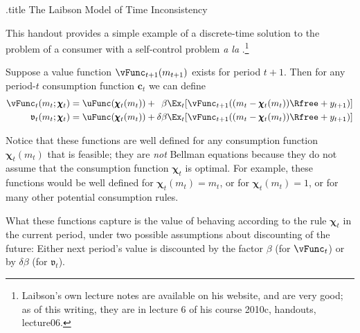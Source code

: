 \documentclass{handout}
\begin{document}
\handoutHeader

\begin{verbatimwrite}{\jobname.title}
The Laibson Model of Time Inconsistency
\end{verbatimwrite}

\handoutNameMake

This handout provides a simple example of a discrete-time 
solution to the problem of a consumer with a self-control
problem {\it a la} \cite{laibson:goldeneggs}.\footnote{Laibson's
own lecture notes are available on his website, and are very
good; as of this writing, they are in lecture 6 of his course 2010c, 
handouts, lecture06.}

\newcommand{\bc}{\mathbf{c}}
\newcommand{\bu}{\uFunc}
\newcommand{\bv}{\vFunc}
\newcommand{\gv}{\mathfrak{v}}
\newcommand{\gc}{\mathfrak{c}}
\newcommand{\bw}{\mathbf{w}}


Suppose a value function $\bv_{t+1}(m_{t+1})$ exists for period $t+1$.  
Then for any period-$t$ consumption function $\bc_{t}$ we can define 
\begin{equation}\begin{gathered}\begin{aligned}
   {\bv}_{t}(m_{t};\pmb{\chi}_{t}) & =  \bu(\pmb{\chi}_{t}(m_{t})) + \phantom{\delta} \beta  \Ex_{t}[{\bv}_{t+1}((m_{t}-\pmb{\chi}_{t}(m_{t}))\Rfree+y_{t+1})] \label{eq:bv}
\\ {\gv}_{t}(m_{t};\pmb{\chi}_{t}) & =  \bu(\pmb{\chi}_{t}(m_{t})) +          \delta  \beta  \Ex_{t}[{\bv}_{t+1}((m_{t}-\pmb{\chi}_{t}(m_{t}))\Rfree+y_{t+1})] %
\end{aligned}\end{gathered}\end{equation}

Notice that these functions are well defined for any consumption function $\pmb{\chi}_{t}(m_{t})$ 
that is feasible; they are {\it not} Bellman equations because they do not assume that
the consumption function $\pmb{\chi}_{t}$ is optimal.  For example, these functions would be
well defined for $\pmb{\chi}_{t}(m_{t}) = m_{t}$, or for $\pmb{\chi}_{t}(m_{t})=1$, or for many other
potential consumption rules.  

What these functions capture is the value of behaving according to the rule $\pmb{\chi}_{t}$ 
in the current period, under two possible assumptions about discounting of the future:
Either next period's value is discounted by the factor $\beta$ (for $\bv_{t}$) or by $\delta \beta$ (for
$\gv_{t}$).  
\end{document}
